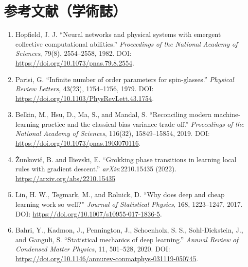\section*{参考文献（学術誌）}
\begin{enumerate}[leftmargin=2.4em]
\item Hopfield, J. J. ``Neural networks and physical systems with emergent collective computational abilities.'' \textit{Proceedings of the National Academy of Sciences}, 79(8), 2554--2558, 1982. DOI: \url{https://doi.org/10.1073/pnas.79.8.2554}.
\item Parisi, G. ``Infinite number of order parameters for spin-glasses.'' \textit{Physical Review Letters}, 43(23), 1754--1756, 1979. DOI: \url{https://doi.org/10.1103/PhysRevLett.43.1754}.
\item Belkin, M., Hsu, D., Ma, S., and Mandal, S. ``Reconciling modern machine-learning practice and the classical bias-variance trade-off.'' \textit{Proceedings of the National Academy of Sciences}, 116(32), 15849--15854, 2019. DOI: \url{https://doi.org/10.1073/pnas.1903070116}.
\item Žunkovič, B. and Ilievski, E. ``Grokking phase transitions in learning local rules with gradient descent.'' \textit{arXiv}:2210.15435 (2022). \url{https://arxiv.org/abs/2210.15435}
\item Lin, H. W., Tegmark, M., and Rolnick, D. ``Why does deep and cheap learning work so well?'' \textit{Journal of Statistical Physics}, 168, 1223--1247, 2017. DOI: \url{https://doi.org/10.1007/s10955-017-1836-5}.
\item Bahri, Y., Kadmon, J., Pennington, J., Schoenholz, S. S., Sohl-Dickstein, J., and Ganguli, S. ``Statistical mechanics of deep learning.'' \textit{Annual Review of Condensed Matter Physics}, 11, 501--528, 2020. DOI: \url{https://doi.org/10.1146/annurev-conmatphys-031119-050745}.
\end{enumerate}
